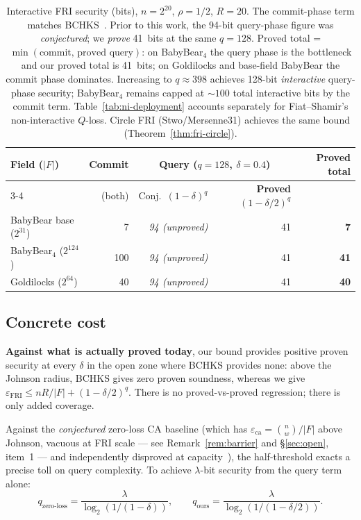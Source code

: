 \documentclass[11pt]{article}
\begin{document}
\begin{table}[h]
\centering
\small
\begin{tabular}{lrrrr}
\toprule
Field ($|F|$) & Commit & \multicolumn{2}{c}{Query ($q{=}128$, $\delta{=}0.4$)} & Proved total \\
\cmidrule(lr){3-4}
 & (both) & Conj.\ $(1{-}\delta)^q$ & \textbf{Proved} $(1{-}\delta/2)^q$ & \\
\midrule
BabyBear base ($2^{31}$)  & 7  & \emph{94 (unproved)} & 41  & \textbf{7} \\
BabyBear$_4$ ($2^{124}$)  & 100 & \emph{94 (unproved)} & 41  & \textbf{41} \\
Goldilocks ($2^{64}$)     & 40 & \emph{94 (unproved)} & 41  & \textbf{40} \\
\bottomrule
\end{tabular}
\caption{Interactive FRI security (bits), $n = 2^{20}$, $\rho = 1/2$, $R = 20$. The commit-phase term matches BCHKS~\cite{BCHKS}. Prior to this work, the 94-bit query-phase figure was \emph{conjectured}; we \emph{prove} 41~bits at the same $q = 128$. Proved total = $\min(\text{commit, proved query})$: on BabyBear$_4$ the query phase is the bottleneck and our proved total is 41~bits; on Goldilocks and base-field BabyBear the commit phase dominates. Increasing to $q \approx 398$ achieves 128-bit \emph{interactive} query-phase security; BabyBear$_4$ remains capped at ${\sim}100$ total interactive bits by the commit term. Table~\ref{tab:ni-deployment} accounts separately for Fiat--Shamir's non-interactive $Q$-loss. Circle FRI (Stwo/Mersenne31) achieves the same bound (Theorem~\ref{thm:fri-circle}).}
\end{table}

\subsection{Concrete cost}
\label{sec:cost}

\textbf{Against what is actually proved today}, our bound provides positive proven security at every $\delta$ in the open zone where BCHKS provides none: above the Johnson radius, BCHKS gives zero proven soundness, whereas we give $\varepsilon_{\mathrm{FRI}} \leq nR/|F| + (1-\delta/2)^q$. There is no proved-vs-proved regression; there is only added coverage.

Against the \emph{conjectured} zero-loss CA baseline (which has $\varepsilon_{\mathrm{ca}} = \binom{n}{w}/|F|$ above Johnson, vacuous at FRI scale --- see Remark~\ref{rem:barrier} and \S\ref{sec:open}, item~1 --- and independently disproved at capacity~\cite{CritesStewart,Kambire}), the half-threshold exacts a precise toll on query complexity. To achieve $\lambda$-bit security from the query term alone:
$$q_{\text{zero-loss}} = \frac{\lambda}{\log_2(1/(1-\delta))}, \qquad q_{\text{ours}} = \frac{\lambda}{\log_2(1/(1-\delta/2))}.$$
\end{document}
